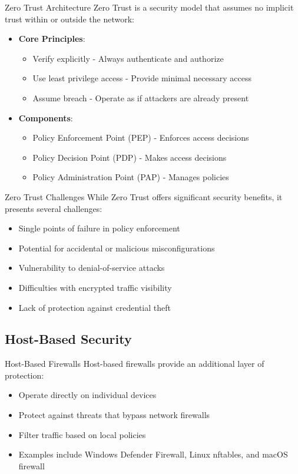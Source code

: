 \begin{concept}{Zero Trust Architecture}
Zero Trust is a security model that assumes no implicit trust within or outside the network:
\begin{itemize}
    \item \textbf{Core Principles}:
    \begin{itemize}
        \item Verify explicitly - Always authenticate and authorize
        \item Use least privilege access - Provide minimal necessary access
        \item Assume breach - Operate as if attackers are already present
    \end{itemize}
    \item \textbf{Components}:
    \begin{itemize}
        \item Policy Enforcement Point (PEP) - Enforces access decisions
        \item Policy Decision Point (PDP) - Makes access decisions
        \item Policy Administration Point (PAP) - Manages policies
    \end{itemize}
\end{itemize}
\end{concept}

\begin{theorem}{Zero Trust Challenges}
While Zero Trust offers significant security benefits, it presents several challenges:
\begin{itemize}
    \item Single points of failure in policy enforcement
    \item Potential for accidental or malicious misconfigurations
    \item Vulnerability to denial-of-service attacks
    \item Difficulties with encrypted traffic visibility
    \item Lack of protection against credential theft
\end{itemize}
\end{theorem}

\subsection{Host-Based Security}

\begin{definition}{Host-Based Firewalls}
Host-based firewalls provide an additional layer of protection:
\begin{itemize}
    \item Operate directly on individual devices
    \item Protect against threats that bypass network firewalls
    \item Filter traffic based on local policies
    \item Examples include Windows Defender Firewall, Linux nftables, and macOS firewall
\end{itemize}
\end{definition}

